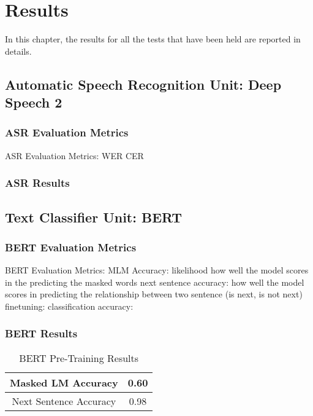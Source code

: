 \chapter{Results}
\label{chap:results}

In this chapter, the results for all the tests that have been held are reported in details.

\section{Automatic Speech Recognition Unit: Deep Speech 2}

\subsection{ASR Evaluation Metrics}




ASR Evaluation Metrics:
WER
CER


\subsection{ASR Results}



\section{Text Classifier Unit: BERT}

\subsection{BERT Evaluation Metrics}
BERT Evaluation Metrics:
MLM Accuracy: likelihood
how well the model scores in the predicting the masked words
next sentence accuracy:
how well the model scores in predicting the relationship between two sentence (is next, is not next)
finetuning:
classification accuracy:

\subsection{BERT Results}

\begin{table}[!ht]
	\centering
	\begin{tabulary}{1.0\textwidth}{ C |C } 
		\hline
		   Masked LM Accuracy &   0.60    \\ [2ex]
		\hline
		Next Sentence Accuracy   &   0.98  \\ [2ex]
		\hline
	\end{tabulary}
	\caption{BERT Pre-Training Results}
	\label{results:table0}
\end{table}

